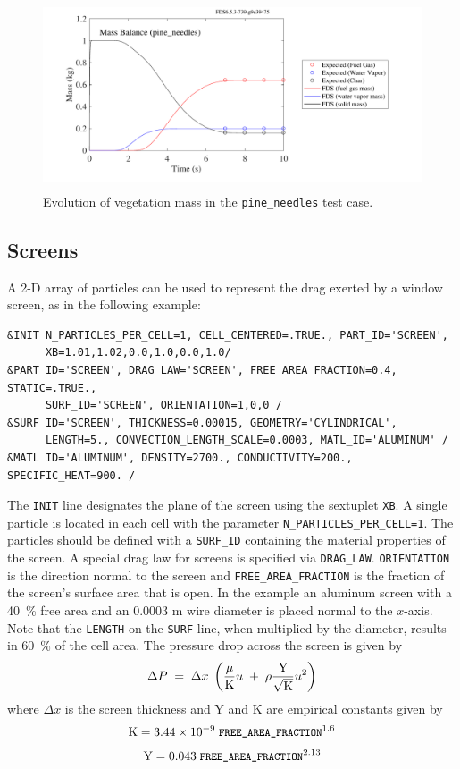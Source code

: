 \documentclass[11pt]{book}
\newcommand{\ct}{\tt\small}
\newcommand{\be}{\begin{equation}}
\newcommand{\ee}{\end{equation}}
\begin{document}
\begin{figure}[ht]
\begin{center}
\includegraphics[height=2.2in]{SCRIPT_FIGURES/pine_needles}
\end{center}
\caption[Example of burning vegetation]{Evolution of vegetation mass in the {\ct pine\_needles} test case.}
\label{pine_needles}
\end{figure}



\subsection{Screens}
\label{info:particle_screen}

A 2-D array of particles can be used to represent the drag exerted by a window screen, as in the following example:

\footnotesize
\begin{verbatim}
&INIT N_PARTICLES_PER_CELL=1, CELL_CENTERED=.TRUE., PART_ID='SCREEN',
      XB=1.01,1.02,0.0,1.0,0.0,1.0/
&PART ID='SCREEN', DRAG_LAW='SCREEN', FREE_AREA_FRACTION=0.4, STATIC=.TRUE.,
      SURF_ID='SCREEN', ORIENTATION=1,0,0 /
&SURF ID='SCREEN', THICKNESS=0.00015, GEOMETRY='CYLINDRICAL',
      LENGTH=5., CONVECTION_LENGTH_SCALE=0.0003, MATL_ID='ALUMINUM' /
&MATL ID='ALUMINUM', DENSITY=2700., CONDUCTIVITY=200., SPECIFIC_HEAT=900. /
\end{verbatim}
\normalsize

\noindent The {\ct INIT} line designates the plane of the screen using the sextuplet {\ct XB}. A single particle is located in each cell with the parameter {\ct N\_PARTICLES\_PER\_CELL=1}.  The particles should be defined with a {\ct SURF\_ID} containing the material properties of the screen.  A special drag law for screens is specified via {\ct DRAG\_LAW}.  {\ct ORIENTATION} is the direction normal to the screen and {\ct FREE\_AREA\_FRACTION} is the fraction of the screen's surface area that is open. In the example an aluminum screen with a 40~\% free area and an 0.0003 m wire diameter is placed normal to the $x$-axis.  Note that the {\ct LENGTH} on the {\ct SURF} line, when multiplied by the diameter, results in 60~\% of the cell area.  The pressure drop across the screen is given by
\be \Delta P \; = \; \Delta x \; \left(\frac{\mu}{\hbox{K}} u \; + \; \rho \frac{\hbox{Y}}{\sqrt {\hbox{K}}} u^2 \right)\ee
where $\Delta x$ is the screen thickness and Y and K are empirical constants given by
\be \hbox{K}= 3.44 \times 10^{-9} \; \hbox{\ct FREE\_AREA\_FRACTION}^{1.6}\ee
\be \hbox{Y}= 0.043 \; \hbox{\ct FREE\_AREA\_FRACTION}^{2.13}\ee
\end{document}
